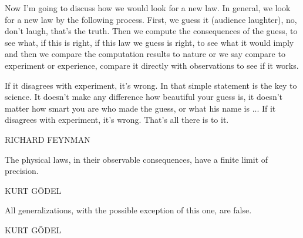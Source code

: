
{\centering
\parbox{\textwidth}{%
  \raggedright
  {\itshape

  Now I'm going to discuss how we would look for a new law. In general, we look for a new law by the following process. First, we guess it (audience laughter), no, don't laugh, that's the truth. Then we compute the consequences of the guess, to see what, if this is right, if this law we guess is right, to see what it would imply and then we compare the computation results to nature or we say compare to experiment or experience, compare it directly with observations to see if it works.

  If it disagrees with experiment, it's wrong. In that simple statement is the key to science. It doesn't make any difference how beautiful your guess is, it doesn't matter how smart you are who made the guess, or what his name is ... If it disagrees with experiment, it's wrong. That's all there is to it.\par\bigskip
  }
  \raggedleft\MakeUppercase{Richard Feynman}\par%
}}

\vspace{5em}

{\centering
\parbox{\textwidth}{%
  \raggedright{\itshape%

  The physical laws, in their observable consequences, have a finite limit of precision.\par\bigskip
  }
  \raggedleft\MakeUppercase{Kurt G{\"o}del}\par%
}}

\vspace{5em}
{\centering
\parbox{\textwidth}{%
  \raggedright{\itshape%

  All generalizations, with the possible exception of this one, are false.\par\bigskip
  }
  \raggedleft\MakeUppercase{Kurt G{\"o}del}\par%
}}

\vfill




